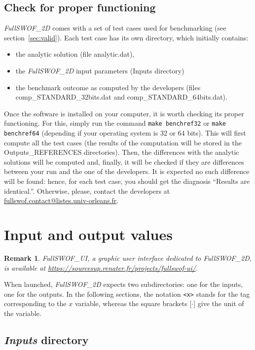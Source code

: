 \documentclass[a4paper, 11pt]{article}
\newcommand{\FullSWOF}{\emph{FullSWOF\_2D}}
\newcommand{\FullSWOFUI}{\emph{FullSWOF\_UI}}
\newtheorem{rmk}{Remark}
\begin{document}
\subsection{Check for proper functioning}\label{sec:functionOK}
\FullSWOF{} comes with a set of test cases used for benchmarking (see section~\ref{sec:valid}). Each test case has its own directory, which initially contains:
\begin{itemize}
\item the analytic solution (file analytic.dat),
\item the \FullSWOF{} input parameters (Inputs directory)
\item the benchmark outcome as computed by the developers (files comp\_STANDARD\_32bits.dat and comp\_STANDARD\_64bits.dat).
\end{itemize}
Once the software is installed on your computer, it is worth checking its proper functioning. For this, simply run the command \verb!make benchref32! or \verb!make benchref64!
(depending if your operating system is 32 or 64 bits).
This will first compute all the test cases (the results of the computation will be stored in the Outputs\_REFERENCES directories).
Then, the differences with the analytic solutions will be computed and, finally, it will be checked if they are differences between your run and the one of the developers. 
It is expected no such difference will be found: hence, for each test case, you should get the diagnosis ``Results are identical.''.
Otherwise, please, contact the developers at {\href{mailto:fullswof.contact@listes.univ-orleans.fr}{fullswof.contact@listes.univ-orleans.fr}}.

\section{Input and output values}
\begin{rmk}
\FullSWOFUI{}, a graphic user interface dedicated to \FullSWOF{}, is available at 
\url{https://sourcesup.renater.fr/projects/fullswof-ui/}.
\end{rmk}

When launched, \FullSWOF{} expects two subdirectories: one for the inputs, one for the outputs. 
In the following sections, the notation \texttt{<x>} stands for the tag corresponding
to the $x$ variable, whereas the square brackets [$\cdot$] give the unit of the variable.  

\subsection{\emph{Inputs} directory}
\end{document}
